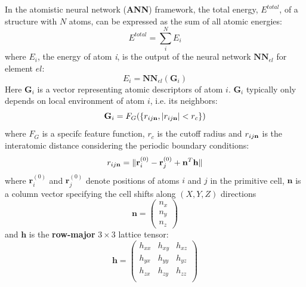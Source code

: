 \documentclass[preprint]{revtex4-2}
\begin{document}
In the atomistic neural network (\textbf{ANN}) framework, the total energy, 
$E^{total}$, of a structure with $N$ atoms, can be expressed as the sum of all 
atomic energies:
\begin{equation}
\label{eq:general_e_total}
E^{total} = \sum_{i}^{N}{E_i}
\end{equation}
where $E_{i}$, the energy of atom \textit{i}, is the output of the neural 
network $\mathbf{NN}_{el}$ for element $el$:
\begin{equation}
E_i = \mathbf{NN}_{el}\left( \mathbf{G}_i \right)
\end{equation} 
Here $\mathbf{G}_i$ is a vector representing atomic descriptors of atom $i$. 
$\mathbf{G}_i$ typically only depends on local environment of atom $i$, i.e.  
its neighbors:
\begin{equation}
\mathbf{G}_i = F_G(\left\{ r_{ij\mathbf{n}}, |r_{ij\mathbf{n}}| < r_c\right\} )
\end{equation}
where $F_G$ is a specifc feature function, $r_c$ is the cutoff radius and 
$r_{ij\mathbf{n}}$ is the interatomic distance considering the periodic boundary 
conditions: 
\begin{equation}
    \label{eq:rijn}
    r_{ij\mathbf{n}} = \Vert \mathbf{r}_i^{(0)} - \mathbf{r}_j^{(0)} + 
    \mathbf{n}^T \mathbf{h} \Vert
\end{equation}
where $\mathbf{r}_i^{(0)}$ and $\mathbf{r}_j^{(0)}$ denote positions of atoms 
$i$ and $j$ in the primitive cell, $\mathbf{n}$ is a column vector specifying 
the cell shifts along $(X,Y,Z)$ directions
\begin{equation}
    \label{eq:ij_shift}
    \mathbf{n} = \begin{pmatrix}
        n_x \\
        n_y \\
        n_z
    \end{pmatrix}
\end{equation}
and $\mathbf{h}$ is the \textbf{row-major} $3 \times 3$ lattice tensor:
\begin{equation}
    \label{eq:lattice}
    \mathbf{h} = \begin{pmatrix}
        h_{xx} & h_{xy} & h_{xz} \\
        h_{yx} & h_{yy} & h_{yz} \\
        h_{zx} & h_{zy} & h_{zz} \\
    \end{pmatrix}
\end{equation}
\end{document}
